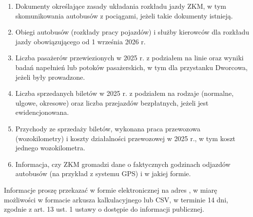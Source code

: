 \begin{enumerate}[resume]
\item Dokumenty określające zasady układania rozkładu jazdy ZKM, w tym skomunikowania autobusów z pociągami, jeżeli takie dokumenty istnieją.
\item Obiegi autobusów (rozkłady pracy pojazdów) i służby kierowców dla rozkładu jazdy obowiązującego od 1 września 2026 r.
\item Liczba pasażerów przewiezionych w 2025 r. z podziałem na linie oraz wyniki badań napełnień lub potoków pasażerskich, w tym dla przystanku Dworcowa, jeżeli były prowadzone.
\item Liczba sprzedanych biletów w 2025 r. z podziałem na rodzaje (normalne, ulgowe, okresowe) oraz liczba przejazdów bezpłatnych, jeżeli jest ewidencjonowana.
\item Przychody ze sprzedaży biletów, wykonana praca przewozowa (wozokilometry) i koszty działalności przewozowej w 2025 r., w tym koszt jednego wozokilometra.
\item Informacja, czy ZKM gromadzi dane o faktycznych godzinach odjazdów autobusów (na przykład z systemu GPS) i w jakiej formie.
\end{enumerate}

Informacje proszę przekazać w formie elektronicznej na adres \EmailNadawcy, w miarę możliwości w formacie arkusza kalkulacyjnego lub CSV, w terminie 14 dni, zgodnie z art. 13 ust. 1 ustawy o dostępie do informacji publicznej.

\Podpis

